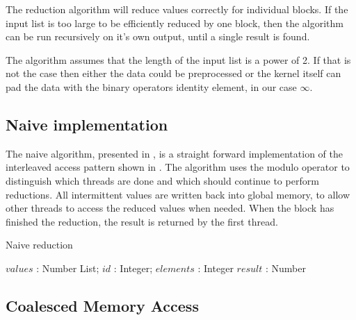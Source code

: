 
The reduction algorithm will reduce values correctly for individual
blocks. If the input list is too large to be efficiently reduced by
one block, then the algorithm can be run recursively on it's own
output, until a single result is found.

The algorithm assumes that the length of the input list is a power of
2. If that is not the case then either the data could be preprocessed
or the kernel itself can pad the data with the binary operators
identity element, in our case $\infty$.

\subsection{Naive implementation}

The naive algorithm, presented in , is a
straight forward implementation of the interleaved access pattern
shown in . The algorithm uses the modulo operator
to distinguish which threads are done and which should continue to
perform reductions. All intermittent values are written back into
global memory, to allow other threads to access the reduced values
when needed. When the block has finished the reduction, the result
is returned by the first thread.

\begin{algorithm}
  \caption{Naive reduction}
  \label{alg:naiveReduct}
  \begin{algorithmic}
              {$values$ : Number List; $id$ : Integer; $elements$ : Integer}
              {$result$ : Number}
              {
                  \ENDIF
                  \SYNC
                \ENDWHILE
                \ENDIF
              }
  \end{algorithmic}
\end{algorithm}

\subsection{Coalesced Memory Access}

